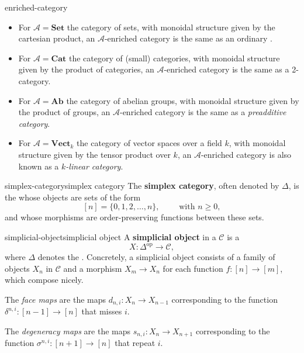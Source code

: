 \begin{example}{enriched-category}
    \begin{itemize}
        \item For $\mathcal{A} = \textbf{Set}$ the category of sets, with monoidal structure given by the cartesian product, an $\mathcal{A}$-enriched category is the same as an ordinary .
        \item For $\mathcal{A} = \textbf{Cat}$ the category of (small) categories, with monoidal structure given by the product of categories, an $\mathcal{A}$-enriched category is the same as a 2-category.
        \item For $\mathcal{A} = \textbf{Ab}$ the category of abelian groups, with monoidal structure given by the product of groups, an $\mathcal{A}$-enriched category is the same as a \textit{preadditive category}.
        \item For $\mathcal{A} = \textbf{Vect}_k$ the category of vector spaces over a field $k$, with monoidal structure given by the tensor product over $k$, an $\mathcal{A}$-enriched category is also known as a \textit{$k$-linear category}.
    \end{itemize}
\end{example}

\begin{topic}{simplex-category}{simplex category}
    The \textbf{simplex category}, often denoted by $\Delta$, is the  whose objects are sets of the form
    \[ [n] = \{ 0, 1, 2, \ldots, n \}, \qquad \text{ with } n \ge 0 , \]
    and whose morphisms are order-preserving functions between these sets.
\end{topic}

\begin{topic}{simplicial-object}{simplicial object}
    A \textbf{simplicial object} in a  $\mathcal{C}$ is a 
    \[ X : \Delta^\text{op} \to \mathcal{C} , \]
    where $\Delta$ denotes the . Concretely, a simplicial object consists of a family of objects $X_n$ in $\mathcal{C}$ and a morphism $X_m \to X_n$ for each function $f : [n] \to [m]$, which compose nicely.
    
    The \textit{face maps} are the maps $d_{n, i} : X_n \to X_{n - 1}$ corresponding to the function $\delta^{n, i} : [n - 1] \to [n]$ that misses $i$.
    
    The \textit{degeneracy maps} are the maps $s_{n, i} : X_n \to X_{n + 1}$ corresponding to the function $\sigma^{n, i} : [n + 1] \to [n]$ that repeat $i$.
\end{topic}


